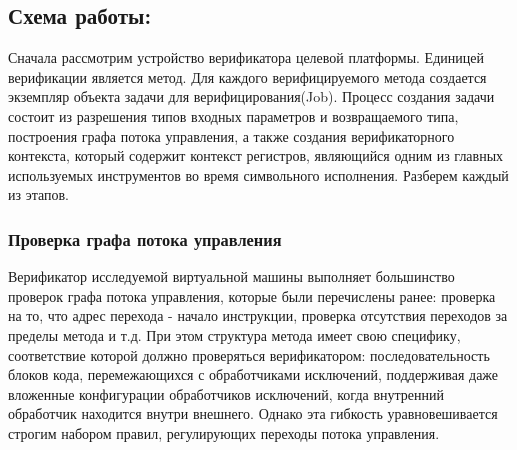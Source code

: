 \subsection{Схема работы: }
Сначала рассмотрим устройство верификатора целевой платформы. Единицей верификации
является метод. Для каждого верифицируемого метода создается экземпляр объекта задачи для верифицирования(Job). 
Процесс создания задачи состоит из разрешения типов входных параметров и возвращаемого типа, построения
графа потока управления, а также создания верификаторного контекста, который содержит контекст 
регистров, являющийся одним из главных используемых инструментов во время символьного исполнения. Разберем
каждый из этапов.

\subsubsection{Проверка графа потока управления} %

Верификатор исследуемой виртуальной машины выполняет большинство проверок графа потока управления, которые были
перечислены ранее: проверка на то, что адрес перехода - начало инструкции, проверка отсутствия переходов за пределы
метода и т.д. При этом структура метода имеет свою специфику, соответствие которой должно проверяться
верификатором: последовательность блоков кода, перемежающихся 
с обработчиками исключений, поддерживая даже вложенные конфигурации обработчиков исключений, когда внутренний 
обработчик находится внутри внешнего. Однако эта гибкость уравновешивается строгим набором правил, 
регулирующих переходы потока управления.

